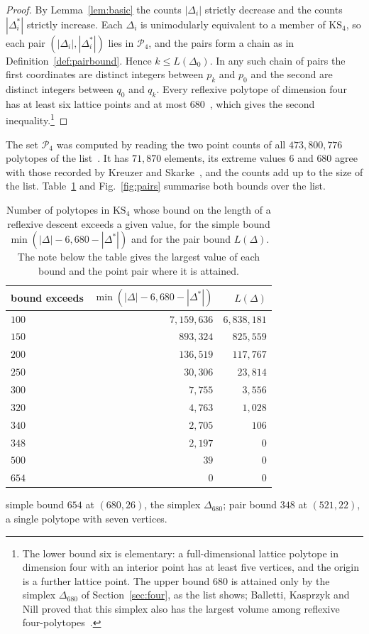 \documentclass[11pt]{amsart}
\theoremstyle{definition}
\theoremstyle{remark}
\newcommand{\KS}{\mathrm{KS}}
\newcommand{\Dbig}{\Delta_{680}}
\begin{document}
\begin{proof}
By Lemma~\ref{lem:basic} the counts $|\Delta_i|$ strictly decrease and the
counts $|\Delta_i^*|$ strictly increase. Each $\Delta_i$ is unimodularly
equivalent to a member of $\KS_4$, so each pair
$(|\Delta_i|,|\Delta_i^*|)$ lies in $\mathcal{P}_4$, and the pairs form a
chain as in Definition~\ref{def:pairbound}. Hence $k\le L(\Delta_0)$. In
any such chain of pairs the first coordinates are distinct integers between
$p_k$ and $p_0$ and the second are distinct integers between $q_0$ and
$q_k$. Every reflexive polytope of dimension four has at least six lattice
points and at most $680$~\cite{KS00}, which gives the second
inequality.\footnote{The lower bound six is elementary: a full-dimensional
lattice polytope in dimension four with an interior point has at least five
vertices, and the origin is a further lattice point. The upper bound $680$
is attained only by the simplex $\Dbig$ of Section~\ref{sec:four}, as the
list shows; Balletti, Kasprzyk and Nill proved that this simplex also has
the largest volume among reflexive four-polytopes~\cite{BKN22}.}
\end{proof}

The set $\mathcal{P}_4$ was computed by reading the two point counts of
all $473{,}800{,}776$ polytopes of the list~\cite{HF4D}. It has $71{,}870$
elements, its extreme values $6$ and $680$ agree with those recorded by
Kreuzer and Skarke~\cite{KS00}, and the counts add up to the size of the
list. Table~\ref{tab:counting} and Fig.~\ref{fig:pairs} summarise both
bounds over the list.

\begin{table}[t]
\caption{Number of polytopes in $\KS_4$ whose bound on the length of a
reflexive descent exceeds a given value, for the simple bound
$\min(|\Delta|-6,680-|\Delta^*|)$ and for the pair bound $L(\Delta)$. The
note below the table gives the largest value of each bound and the point pair where it
is attained.}\label{tab:counting}
\centering
\begin{tabular}{lrr}
\toprule
bound exceeds & $\min(|\Delta|-6,680-|\Delta^*|)$ & $L(\Delta)$\\
\midrule
$100$ & $7{,}159{,}636$ & $6{,}838{,}181$\\
$150$ & $893{,}324$ & $825{,}559$\\
$200$ & $136{,}519$ & $117{,}767$\\
$250$ & $30{,}306$ & $23{,}814$\\
$300$ & $7{,}755$ & $3{,}556$\\
$320$ & $4{,}763$ & $1{,}028$\\
$340$ & $2{,}705$ & $106$\\
$348$ & $2{,}197$ & $0$\\
$500$ & $39$ & $0$\\
$654$ & $0$ & $0$\\
\bottomrule
\end{tabular}
\par\smallskip
\parbox{0.9\textwidth}{\small\raggedright simple bound $654$ at $(680,26)$, the simplex $\Dbig$; pair bound $348$ at $(521,22)$, a single polytope with seven vertices.}
\end{table}
\end{document}
